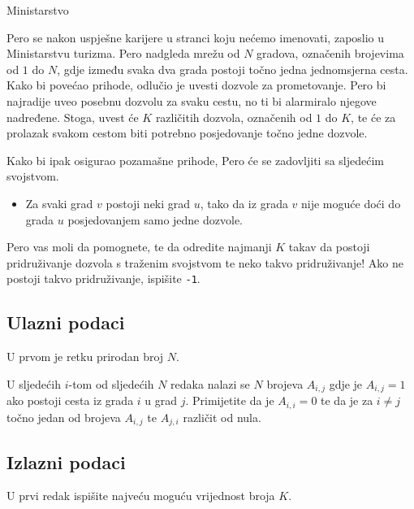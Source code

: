 \begin{statement}[
  problempoints=100,
  timelimit=1 sekunda,
  memorylimit=1024 MiB,
]{Ministarstvo}

Pero se nakon uspješne karijere u stranci koju nećemo imenovati, zaposlio u Ministarstvu turizma. Pero nadgleda mrežu od $N$ gradova, označenih brojevima od $1$ do $N$, gdje između svaka dva grada postoji točno jedna jednomsjerna cesta. Kako bi povećao prihode, odlučio je uvesti dozvole za prometovanje. Pero bi najradije uveo posebnu dozvolu za svaku cestu, no ti bi alarmiralo njegove nadređene. Stoga, uvest će $K$ različitih dozvola, označenih od $1$ do $K$, te će za prolazak svakom cestom biti potrebno posjedovanje točno jedne dozvole. 

Kako bi ipak osigurao pozamašne prihode, Pero će se zadovljiti sa sljedećim svojstvom.

\begin{itemize}
\item Za svaki grad $v$ postoji neki grad $u$, tako da iz grada $v$ nije moguće doći do grada $u$ posjedovanjem samo jedne dozvole.
\end{itemize} 

Pero vas moli da pomognete, te da odredite najmanji $K$ takav da postoji pridruživanje dozvola s traženim svojstvom te neko takvo pridruživanje! Ako ne postoji takvo pridruživanje, ispišite \texttt{-1}. 

\subsection*{Ulazni podaci}

U prvom je retku prirodan broj $N$.

U sljedećih $i$-tom od sljedećih $N$ redaka nalazi se $N$ brojeva $A_{i, j}$ gdje je $A_{i, j} = 1$ ako postoji cesta iz grada $i$ u grad $j$. Primijetite da je $A_{i, i} = 0$ te da je za $i \neq j$ točno jedan od brojeva $A_{i, j}$ te $A_{j, i}$ različit od nula. 

\subsection*{Izlazni podaci}

U prvi redak ispišite najveću moguću vrijednost broja $K$.


\end{statement}
